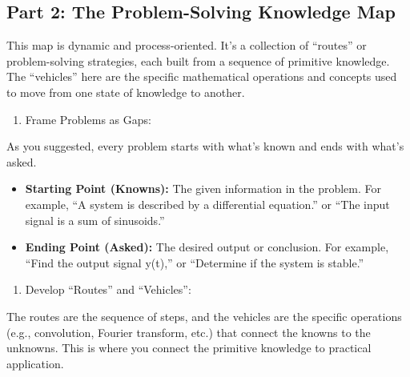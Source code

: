 \documentclass[
  letterpaper,
  DIV=11,
  numbers=noendperiod]{scrreprt}
\providecommand{\tightlist}{%
  \setlength{\itemsep}{0pt}\setlength{\parskip}{0pt}}\usepackage{longtable,booktabs,array}
\begin{document}
\subsection{Part 2: The Problem-Solving Knowledge
Map}\label{part-2-the-problem-solving-knowledge-map}

This map is dynamic and process-oriented. It's a collection of
``routes'' or problem-solving strategies, each built from a sequence of
primitive knowledge. The ``vehicles'' here are the specific mathematical
operations and concepts used to move from one state of knowledge to
another.

\begin{enumerate}
\def\labelenumi{\arabic{enumi}.}
\tightlist
\item
  Frame Problems as Gaps:
\end{enumerate}

As you suggested, every problem starts with what's known and ends with
what's asked.

\begin{itemize}
\item
  \textbf{Starting Point (Knowns):} The given information in the
  problem. For example, ``A system is described by a differential
  equation.'' or ``The input signal is a sum of sinusoids.''
\item
  \textbf{Ending Point (Asked):} The desired output or conclusion. For
  example, ``Find the output signal y(t),'' or ``Determine if the system
  is stable.''
\end{itemize}

\begin{enumerate}
\def\labelenumi{\arabic{enumi}.}
\setcounter{enumi}{1}
\tightlist
\item
  Develop ``Routes'' and ``Vehicles'':
\end{enumerate}

The routes are the sequence of steps, and the vehicles are the specific
operations (e.g., convolution, Fourier transform, etc.) that connect the
knowns to the unknowns. This is where you connect the primitive
knowledge to practical application.
\end{document}
